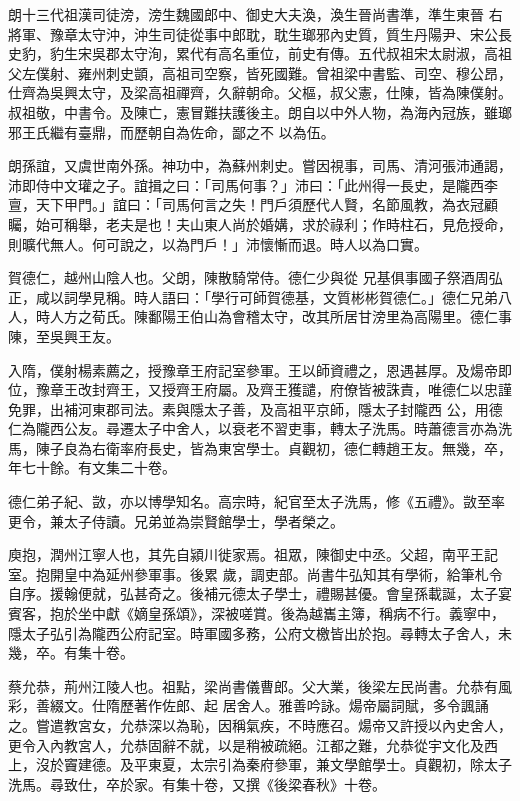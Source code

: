 \begin{pinyinscope}
 朗十三代祖漢司徒滂，滂生魏國郎中、御史大夫渙，渙生晉尚書準，準生東晉
 右將軍、豫章太守沖，沖生司徒從事中郎耽，耽生瑯邪內史質，質生丹陽尹、宋公長史豹，豹生宋吳郡太守洵，累代有高名重位，前史有傳。五代叔祖宋太尉淑，高祖父左僕射、雍州刺史顗，高祖司空察，皆死國難。曾祖梁中書監、司空、穆公昂，仕齊為吳興太守，及梁高祖禪齊，久辭朝命。父樞，叔父憲，仕陳，皆為陳僕射。叔祖敬，中書令。及陳亡，憲冒難扶護後主。朗自以中外人物，為海內冠族，雖瑯邪王氏繼有臺鼎，而歷朝自為佐命，鄙之不
 以為伍。



 朗孫誼，又虞世南外孫。神功中，為蘇州刺史。嘗因視事，司馬、清河張沛通謁，沛即侍中文瓘之子。誼揖之曰：「司馬何事？」沛曰：「此州得一長史，是隴西李亶，天下甲門。」誼曰：「司馬何言之失！門戶須歷代人賢，名節風教，為衣冠顧矚，始可稱舉，老夫是也！夫山東人尚於婚媾，求於祿利；作時柱石，見危授命，則曠代無人。何可說之，以為門戶！」沛懷慚而退。時人以為口實。



 賀德仁，越州山陰人也。父朗，陳散騎常侍。德仁少與從
 兄基俱事國子祭酒周弘正，咸以詞學見稱。時人語曰：「學行可師賀德基，文質彬彬賀德仁。」德仁兄弟八人，時人方之荀氏。陳鄱陽王伯山為會稽太守，改其所居甘滂里為高陽里。德仁事陳，至吳興王友。



 入隋，僕射楊素薦之，授豫章王府記室參軍。王以師資禮之，恩遇甚厚。及煬帝即位，豫章王改封齊王，又授齊王府屬。及齊王獲譴，府僚皆被誅責，唯德仁以忠謹免罪，出補河東郡司法。素與隱太子善，及高祖平京師，隱太子封隴西
 公，用德仁為隴西公友。尋遷太子中舍人，以衰老不習吏事，轉太子洗馬。時蕭德言亦為洗馬，陳子良為右衛率府長史，皆為東宮學士。貞觀初，德仁轉趙王友。無幾，卒，年七十餘。有文集二十卷。



 德仁弟子紀、敳，亦以博學知名。高宗時，紀官至太子洗馬，修《五禮》。敳至率更令，兼太子侍讀。兄弟並為崇賢館學士，學者榮之。



 庾抱，潤州江寧人也，其先自潁川徙家焉。祖眾，陳御史中丞。父超，南平王記室。抱開皇中為延州參軍事。後累
 歲，調吏部。尚書牛弘知其有學術，給筆札令自序。援翰便就，弘甚奇之。後補元德太子學士，禮賜甚優。會皇孫載誕，太子宴賓客，抱於坐中獻《嫡皇孫頌》，深被嗟賞。後為越巂主簿，稱病不行。義寧中，隱太子弘引為隴西公府記室。時軍國多務，公府文檄皆出於抱。尋轉太子舍人，未幾，卒。有集十卷。



 蔡允恭，荊州江陵人也。祖點，梁尚書儀曹郎。父大業，後梁左民尚書。允恭有風彩，善綴文。仕隋歷著作佐郎、起
 居舍人。雅善吟詠。煬帝屬詞賦，多令諷誦之。嘗遣教宮女，允恭深以為恥，因稱氣疾，不時應召。煬帝又許授以內史舍人，更令入內教宮人，允恭固辭不就，以是稍被疏絕。江都之難，允恭從宇文化及西上，沒於竇建德。及平東夏，太宗引為秦府參軍，兼文學館學士。貞觀初，除太子洗馬。尋致仕，卒於家。有集十卷，又撰《後梁春秋》十卷。




\end{pinyinscope}
